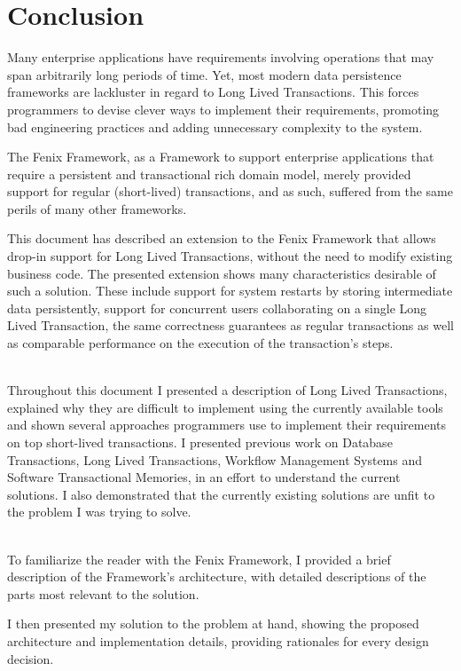 \chapter{Conclusion}

Many enterprise applications have requirements involving operations
that may span arbitrarily long periods of time. Yet, most modern data
persistence frameworks are lackluster in regard to Long Lived
Transactions. This forces programmers to devise clever ways to
implement their requirements, promoting bad engineering practices and
adding unnecessary complexity to the system.

The Fenix Framework, as a Framework to support enterprise applications
that require a persistent and transactional rich domain model, merely
provided support for regular (short-lived) transactions, and as such,
suffered from the same perils of many other frameworks.

This document has described an extension to the Fenix Framework that
allows drop-in support for Long Lived Transactions, without the need
to modify existing business code. The presented extension shows
many characteristics desirable of such a solution. These include
support for system restarts by storing intermediate data persistently,
support for concurrent users collaborating on a single Long Lived
Transaction, the same correctness guarantees as regular transactions
as well as comparable performance on the execution of the
transaction's steps.

~\\

Throughout this document I presented a description of Long Lived
Transactions, explained why they are difficult to implement using the
currently available tools and shown several approaches programmers use
to implement their requirements on top short-lived transactions. I
presented previous work on Database Transactions, Long Lived
Transactions, Workflow Management Systems and Software
Transactional Memories, in an effort to understand the current
solutions. I also demonstrated that the currently existing solutions
are unfit to the problem I was trying to solve.

~\\

To familiarize the reader with the Fenix Framework, I provided a brief
description of the Framework's architecture, with detailed
descriptions of the parts most relevant to the solution.

I then presented my solution to the problem at hand, showing the
proposed architecture and implementation details, providing rationales
for every design decision.

